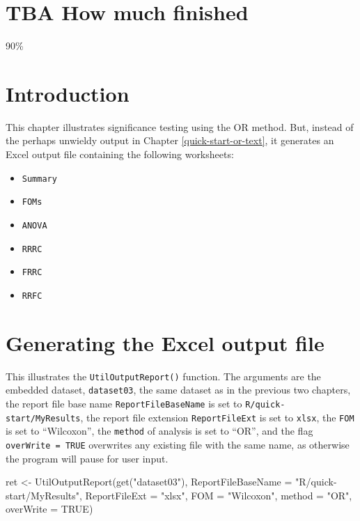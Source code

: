 \documentclass[
]{book}
\newenvironment{Shaded}{\begin{snugshade}}{\end{snugshade}}
\newcommand{\AttributeTok}[1]{\textcolor[rgb]{0.77,0.63,0.00}{#1}}
\newcommand{\ConstantTok}[1]{\textcolor[rgb]{0.00,0.00,0.00}{#1}}
\newcommand{\FunctionTok}[1]{\textcolor[rgb]{0.00,0.00,0.00}{#1}}
\newcommand{\NormalTok}[1]{#1}
\newcommand{\OtherTok}[1]{\textcolor[rgb]{0.56,0.35,0.01}{#1}}
\newcommand{\StringTok}[1]{\textcolor[rgb]{0.31,0.60,0.02}{#1}}
\providecommand{\tightlist}{%
  \setlength{\itemsep}{0pt}\setlength{\parskip}{0pt}}
\begin{document}
\hypertarget{quick-start-or-excel-how-much-finished}{%
\section{TBA How much finished}\label{quick-start-or-excel-how-much-finished}}

90\%

\hypertarget{quick-start-or-excel-intro}{%
\section{Introduction}\label{quick-start-or-excel-intro}}

This chapter illustrates significance testing using the OR method. But, instead of the perhaps unwieldy output in Chapter \ref{quick-start-or-text}, it generates an Excel output file containing the following worksheets:

\begin{itemize}
\tightlist
\item
  \texttt{Summary}
\item
  \texttt{FOMs}
\item
  \texttt{ANOVA}
\item
  \texttt{RRRC}
\item
  \texttt{FRRC}
\item
  \texttt{RRFC}
\end{itemize}

\hypertarget{quick-start-or-excel-output}{%
\section{Generating the Excel output file}\label{quick-start-or-excel-output}}

This illustrates the \texttt{UtilOutputReport()} function. The arguments are the embedded dataset, \texttt{dataset03}, the same dataset as in the previous two chapters, the report file base name \texttt{ReportFileBaseName} is set to \texttt{R/quick-start/MyResults}, the report file extension \texttt{ReportFileExt} is set to \texttt{xlsx}, the \texttt{FOM} is set to ``Wilcoxon'', the \texttt{method} of analysis is set to ``OR'', and the flag \texttt{overWrite\ =\ TRUE} overwrites any existing file with the same name, as otherwise the program will pause for user input.

\begin{Shaded}
\begin{Highlighting}[]
\NormalTok{ret }\OtherTok{\textless{}{-}} \FunctionTok{UtilOutputReport}\NormalTok{(}\FunctionTok{get}\NormalTok{(}\StringTok{"dataset03"}\NormalTok{), }
                        \AttributeTok{ReportFileBaseName =} \StringTok{"R/quick{-}start/MyResults"}\NormalTok{, }
                        \AttributeTok{ReportFileExt =} \StringTok{"xlsx"}\NormalTok{,  }
                        \AttributeTok{FOM =} \StringTok{"Wilcoxon"}\NormalTok{, }
                        \AttributeTok{method =} \StringTok{"OR"}\NormalTok{, }
                        \AttributeTok{overWrite =} \ConstantTok{TRUE}\NormalTok{)}
\end{Highlighting}
\end{Shaded}
\end{document}
